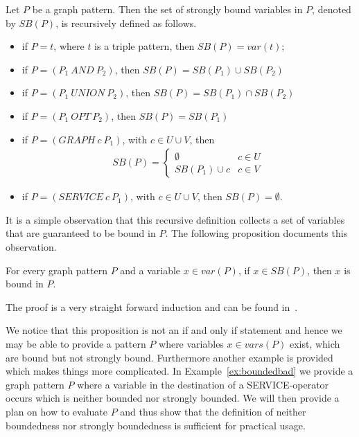 \begin{definition}\label{def:strongboundedness}
Let $P$ be a graph pattern. Then the set of strongly bound variables in $P$,
denoted by $SB(P)$, is recursively defined as follows.

\begin{itemize}
\item if $P =t$, where $t$ is a triple pattern, then $SB(P) = var(t)$;
\item if $P = (P_1 \ AND \ P_2)$, then $SB(P) = SB(P_1) \cup SB(P_2)$ 
\item if $P = (P_1  \ UNION \ P_2)$, then $SB(P) = SB(P_1) \cap SB(P_2)$ 
\item if $P = (P_1 \ OPT \ P_2)$, then $SB(P) = SB(P_1)$ 
\item if $P = (GRAPH \ c \ P_1)$, with $c \in U\cup V$, 
then\\
\begin{align*}
	SB(P) = 
\begin{cases} 
    \emptyset & \mbox{$c \in U$} \\
    SB(P_1) \cup c &\mbox{$c \in V$} 
\end{cases}
\end{align*}

\item if $P = (SERVICE \ c \ P_1)$, with $c \in U \cup V$, then $SB(P) = \emptyset$.
\end{itemize}
\end{definition}

It is a simple observation that this recursive definition collects a set of
variables that are guaranteed to be bound in $P$. The following proposition
documents this observation.

\begin{proposition}\label{sbinb}
For every graph pattern $P$ and a variable $x \in var(P)$, if $x \in SB(P)$,
then $x$ is bound in $P$.
\end{proposition}
The proof is a very straight forward induction and can be found
in~\cite[Appendix A]{BuilAranda20131}.

We notice that this proposition is not an if and only if statement and hence we may be
able to provide a pattern $P$ where variables $x \in vars(P)$ exist, which are bound but not
strongly bound. Furthermore another example is provided which makes things more
complicated. In Example~\ref{ex:boundedbad} we provide a graph pattern $P$ where a variable in the
destination of a SERVICE-operator occurs which is neither bounded nor strongly
bounded. We will then provide a plan on how to evaluate $P$ and thus show that
the definition of neither boundedness nor strongly boundedness is sufficient for
practical usage. 

